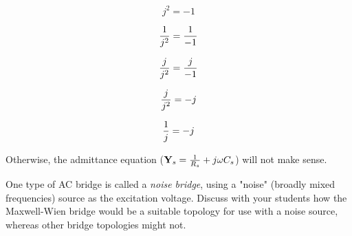 $$j^2 = -1$$

$${1 \over j^2} = {1 \over -1}$$

$${j \over j^2} = {j \over -1}$$

$${j \over j^2} = -j$$

$${1 \over j} = -j$$

Otherwise, the admittance equation (${\bf Y}_s = {1 \over R_s} + j\omega C_s$) will not make sense.

\vskip 10pt

One type of AC bridge is called a {\it noise bridge}, using a "noise" (broadly mixed frequencies) source as the excitation voltage.  Discuss with your students how the Maxwell-Wien bridge would be a suitable topology for use with a noise source, whereas other bridge topologies might not.




